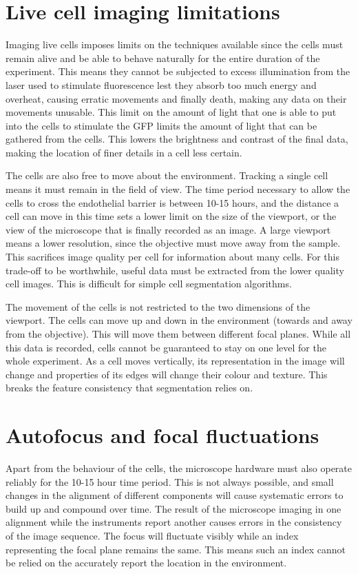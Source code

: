 \section{Live cell imaging limitations}

Imaging live cells imposes limits on the techniques available since the cells must remain alive and be able to behave naturally for the entire duration of the experiment. This means they cannot be subjected to excess illumination from the laser used to stimulate fluorescence lest they absorb too much energy and overheat, causing erratic movements and finally death, making any data on their movements unusable. This limit on the amount of light that one is able to put into the cells to stimulate the GFP limits the amount of light that can be gathered from the cells. This lowers the brightness and contrast of the final data, making the location of finer details in a cell less certain.

The cells are also free to move about the environment. Tracking a single cell means it must remain in the field of view. The time period necessary to allow the cells to cross the endothelial barrier is between 10-15 hours, and the distance a cell can move in this time sets a lower limit on the size of the viewport, or the view of the microscope that is finally recorded as an image. A large viewport means a lower resolution, since the objective must move away from the sample. This sacrifices image quality per cell for information about many cells. For this trade-off to be worthwhile, useful data must be extracted from the lower quality cell images. This is difficult for simple cell segmentation algorithms.

The movement of the cells is not restricted to the two dimensions of the viewport. The cells can move up and down in the environment (towards and away from the objective). This will move them between different focal planes. While all this data is recorded, cells cannot be guaranteed to stay on one level for the whole experiment. As a cell moves vertically, its representation in the image will change and properties of its edges will change their colour and texture. This breaks the feature consistency that segmentation relies on.

\section{Autofocus and focal fluctuations}

Apart from the behaviour of the cells, the microscope hardware must also operate reliably for the 10-15 hour time period. This is not always possible, and small changes in the alignment of different components will cause systematic errors to build up and compound over time. The result of the microscope imaging in one alignment while the instruments report another causes errors in the consistency of the image sequence. The focus will fluctuate visibly while an index representing the focal plane remains the same. This means such an index cannot be relied on the accurately report the location in the environment.

